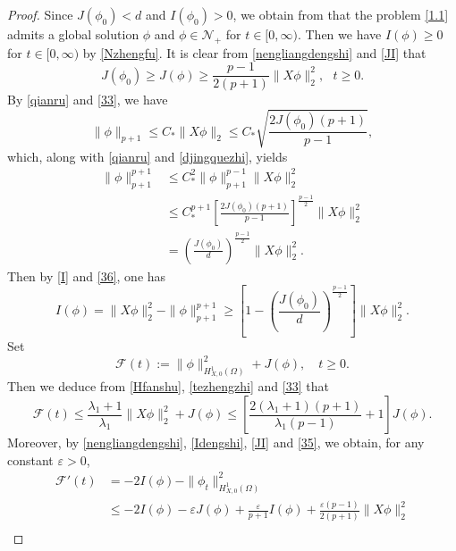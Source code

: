 \documentclass[11pt,a4paper]{article}
\numberwithin{equation}{section}
\numberwithin{remark}{section}
\begin{document}
\begin{proof}
Since $J(\phi_0)<d$ and $I(\phi_0)>0$, we obtain from \cite[Theorem 1.4]{MR3961341} that the problem \eqref{1.1} admits a global solution $\phi$ and $\phi\in \mathcal{N}_+$ for $t\in[0,\infty)$. Then we have $I(\phi)\geq0$ for $t\in[0,\infty)$ by \eqref{Nzhengfu}. It is clear from \eqref{nengliangdengshi} and \eqref{JI} that
\begin{equation}\label{33}
J(\phi_0)\geq J(\phi)\geq\frac{p-1}{2(p+1)}\|X\phi\|_2^2,\ \ \ t\geq0.
\end{equation}
By \eqref{qianru} and \eqref{33}, we have
\begin{equation*}
\|\phi\|_{p+1}\leq C_*\|X\phi\|_2\leq C_*\sqrt{\frac{2J(\phi_0)(p+1)}{p-1}},
\end{equation*}
which, along with \eqref{qianru} and \eqref{djingquezhi}, yields
\begin{equation}\label{36}
\begin{split}
\|\phi\|_{p+1}^{p+1}&\leq C_*^2\|\phi\|_{p+1}^{p-1}\|X\phi\|_2^2\\
&\leq C_*^{p+1}\left[\frac{2J(\phi_0)(p+1)}{p-1}\right]^{\frac{p-1}{2}}\|X\phi\|_2^2\\
&=\left(\frac{J(\phi_0)}{d}\right)^{\frac{p-1}{2}}\|X\phi\|_2^2.
\end{split}\end{equation}
Then by \eqref{I} and \eqref{36}, one has
\begin{equation}\label{35}
I(\phi)=\|X\phi\|_2^2-\|\phi\|_{p+1}^{p+1}\geq\left[1-\left(\frac{J(\phi_0)}{d}\right)^{\frac{p-1}{2}}\right]\|X\phi\|_2^2.
\end{equation}
Set
\begin{equation*}
\mathcal{F}(t):=\|\phi\|_{H_{X,0}^1(\Omega)}^2+J(\phi),\quad t\geq0.
\end{equation*}
Then we deduce from \eqref{Hfanshu}, \eqref{tezhengzhi} and \eqref{33} that
\begin{equation}\label{38}
\mathcal{F}(t)\leq\frac{\lambda_1+1}{\lambda_1}\|X\phi\|_2^2+J(\phi)
\leq\left[\frac{2(\lambda_1+1)(p+1)}{\lambda_1(p-1)}+1\right]J(\phi).
\end{equation}
Moreover, by \eqref{nengliangdengshi}, \eqref{Idengshi}, \eqref{JI} and \eqref{35}, we obtain, for any constant $\varepsilon>0$,
\begin{equation}\label{37}
\begin{split}
\mathcal{F}'(t)&=-2I(\phi)-\|\phi_t\|_{H_{X,0}^1(\Omega)}^2\\
&\leq-2I(\phi)-\varepsilon J(\phi)+\frac{\varepsilon}{p+1}I(\phi)+\frac{\varepsilon(p-1)}{2(p+1)}\|X\phi\|_2^2\\

\end{split}
\end{equation}
\end{proof}
\end{document}
